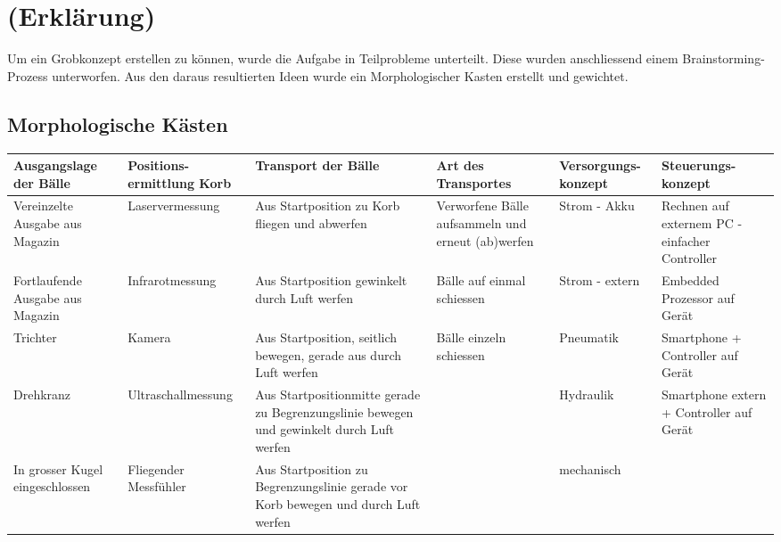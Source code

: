 \newcommand{\myspace}{3.1cm}

\section{(Erklärung)}
	Um ein Grobkonzept erstellen zu können, wurde die Aufgabe in Teilprobleme unterteilt. Diese wurden anschliessend einem Brainstorming-Prozess unterworfen. Aus den daraus resultierten Ideen wurde ein Morphologischer Kasten erstellt und gewichtet.
\begin{landscape}
	\section{Morphologische Kästen}
	
	\begin{tabular}{|p{\myspace}|p{\myspace}|p{\myspace}|p{\myspace}|p{\myspace}|p{\myspace}|} \hline
	\textbf{Ausgangslage der Bälle} & \textbf{Positions-ermittlung Korb} & \textbf{Transport der Bälle} & \textbf{Art des Transportes} & \textbf{Versorgungs-konzept} & \textbf{Steuerungs-konzept}\\ \hline
	
	Vereinzelte Ausgabe aus Magazin & Laservermessung & Aus Startposition zu Korb fliegen und abwerfen & Verworfene Bälle aufsammeln und erneut (ab)werfen & \cellcolor{green}Strom - Akku & Rechnen auf externem PC - einfacher Controller\\ \hline
	\cellcolor{green}Fortlaufende Ausgabe aus Magazin & Infrarotmessung & \cellcolor{green}Aus Startposition gewinkelt durch Luft werfen & Bälle auf einmal schiessen & Strom - extern & Embedded Prozessor auf Gerät \\ \hline
	Trichter & \cellcolor{green}Kamera & Aus Startposition, seitlich bewegen, gerade aus durch Luft werfen & \cellcolor{green}Bälle einzeln schiessen & Pneumatik & \cellcolor{green}Smartphone + Controller auf Gerät\\ \hline
	Drehkranz & Ultraschallmessung & Aus Startpositionmitte gerade zu Begrenzungslinie bewegen und gewinkelt durch Luft werfen & & Hydraulik & Smartphone extern + Controller auf Gerät\\ \hline
	In grosser Kugel eingeschlossen& Fliegender Messfühler & Aus Startposition zu Begrenzungslinie gerade vor Korb bewegen und durch Luft werfen & & mechanisch & \\ \hline
		

\end{tabular}
\end{landscape}

